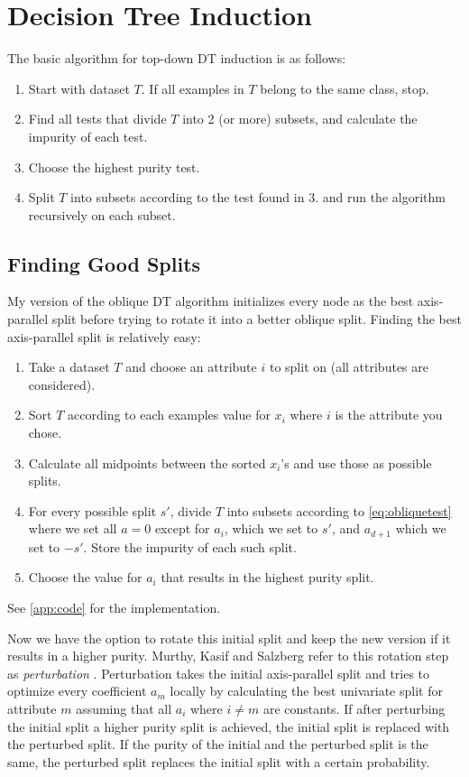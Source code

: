 \documentclass[12pt]{article}
\begin{document}
\section{Decision Tree Induction}
The basic algorithm for top-down DT induction is as follows:
\begin{enumerate}
\item Start with dataset $T$. If all examples in $T$ belong to the same class, stop.
\item Find all tests that divide $T$ into 2 (or more) subsets, and calculate the impurity of each test.
\item Choose the highest purity test.
\item Split $T$ into subsets according to the test found in $3.$ and run the algorithm recursively on each subset.
\end{enumerate}

\subsection{Finding Good Splits}
My version of the oblique DT algorithm initializes every node as the best axis-parallel split before trying to rotate it into a better oblique split. Finding the best axis-parallel split is relatively easy:
\begin{enumerate}
\item Take a dataset $T$ and choose an attribute $i$ to split on (all attributes are considered).
\item Sort $T$ according to each examples value for $x_i$ where $i$ is the attribute you chose.
\item Calculate all midpoints between the sorted $x_i$'s and use those as possible splits.
\item For every possible split $s'$, divide $T$ into subsets according to \cref{eq:obliquetest} where we set all $a = 0$ except for $a_i$, which we set to $s'$, and $a_{d+1}$ which we set to $-s'$. Store the impurity of each such split.
\item Choose the value for $a_i$ that results in the highest purity split.
\end{enumerate}

See \cref{app:code} for the implementation.

Now we have the option to rotate this initial split and keep the new version if it results in a higher purity. Murthy, Kasif and Salzberg refer to this rotation step as \emph{perturbation} \cite{KSM:1994}. Perturbation takes the initial axis-parallel split and tries to optimize every coefficient $a_m$ locally by calculating the best univariate split for attribute $m$ assuming that all $a_i$ where $i \neq m$ are constants. If after perturbing the initial split a higher purity split is achieved, the initial split is replaced with the perturbed split. If the purity of the initial and the perturbed split is the same, the perturbed split replaces the initial split with a certain probability.
\end{document}
